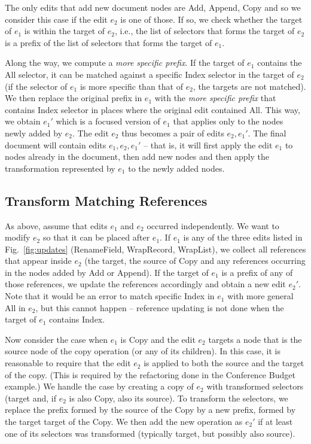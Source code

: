 \documentclass[sigconf,anonymous,screen]{acmart}
\newcommand{\ident}[1]{{\sffamily #1}}
\begin{document}
The only edits that add new document nodes are \ident{Add}, \ident{Append}, \ident{Copy} and
so we consider this case if the edit $e_2$ is one of those. If so, we check
whether the target of $e_1$ is within the target of $e_2$, i.e., the list of selectors that
forms the target of $e_2$ is a prefix of the list of selectors that forms the target of $e_1$.

Along the way, we compute a \emph{more specific prefix}. If the target of $e_1$ contains
the \ident{All} selector, it can be matched against a specific \ident{Index} selector in the
target of $e_2$ (if the selector of $e_1$ is more specific than that of $e_2$, the targets
are not matched). We then replace the original prefix in $e_1$ with the \emph{more specific prefix}
that contains \ident{Index} selector in places where the original edit contained \ident{All}.
This way, we obtain $e_1'$ which is a focused version of $e_1$ that applies only to the
nodes newly added by $e_2$. The edit $e_2$ thus becomes a pair of edits $e_2, e_1'$.
The final document will contain edits $e_1, e_2, e_1'$ -- that is, it will first apply the edit
$e_1$ to nodes already in the document, then add new nodes and then apply the transformation
represented by $e_1$ to the newly added nodes.

\subsection{Transform Matching References}
\label{app:merge-transform-refs}

As above, assume that edits $e_1$ and $e_2$ occurred independently. We want to
modify $e_2$ so that it can be placed after $e_1$. If $e_1$ is any of the three edits
listed in Fig.~\ref{fig:updates} (\ident{RenameField}, \ident{WrapRecord}, \ident{WrapList}),
we collect all references that appear inside $e_2$ (the target, the source of \ident{Copy}
and any references occurring in the nodes added by \ident{Add} or \ident{Append}).
If the target of $e_1$ is a prefix of any of those references, we update the references
accordingly and obtain a new edit $e_2'$. Note that it would be an error to match specific
\ident{Index} in $e_1$ with more general \ident{All} in $e_2$, but this cannot happen --
reference updating is not done when the target of $e_1$ contains \ident{Index}.

Now consider the case when $e_1$ is \ident{Copy} and the edit $e_2$ targets a node that is
the source node of the copy operation (or any of its children). In this case, it is reasonable
to require that the edit $e_2$ is applied to both the source and the target of the copy.
(This is required by the refactoring done in the Conference Budget example.)
We handle the case by creating a copy of $e_2$ with transformed selectors (target and, if $e_2$
is also \ident{Copy}, also its source). To transform the selectors, we replace the prefix
formed by the source of the \ident{Copy} by a new prefix, formed by the target target of
the \ident{Copy}. We then add the new operation as $e_2'$ if at least one of its selectors
was transformed (typically target, but possibly also source).
\end{document}
